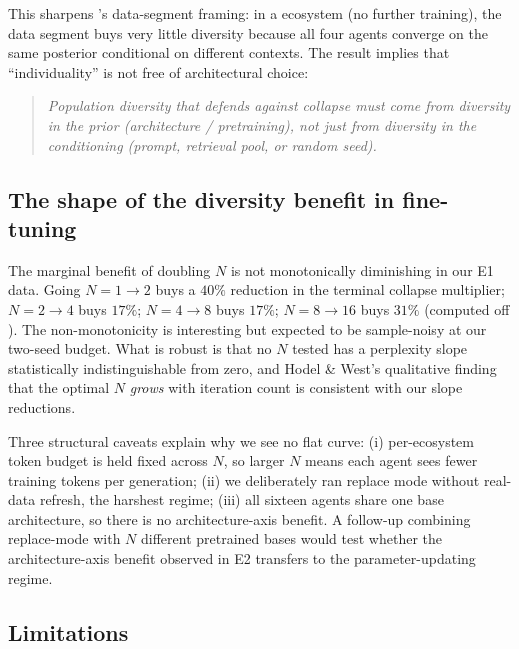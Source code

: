 This sharpens \citet{hodel2026epistemic}'s data-segment framing: in a
\rag ecosystem (no further training), the data segment buys very
little diversity because all four agents converge on the same
posterior conditional on different contexts. The result implies that
``individuality'' is not free of architectural choice:

\begin{quote}
\itshape
Population diversity that defends against collapse must come from
diversity in the \emph{prior} (architecture / pretraining), not just
from diversity in the \emph{conditioning} (prompt, retrieval pool,
or random seed).
\end{quote}

\subsection{The shape of the diversity benefit in fine-tuning}

The marginal benefit of doubling $N$ is not monotonically diminishing
in our E1 data. Going $N{=}1 \to 2$ buys a $40\%$ reduction in the
terminal collapse multiplier; $N{=}2 \to 4$ buys $17\%$;
$N{=}4 \to 8$ buys $17\%$; $N{=}8 \to 16$ buys $31\%$ (computed off
). The non-monotonicity is interesting but
expected to be sample-noisy at our two-seed budget. What is robust is
that no $N$ tested has a perplexity slope statistically
indistinguishable from zero, and Hodel \& West's qualitative finding
that the optimal $N$ \emph{grows} with iteration count
\citep{hodel2026epistemic} is consistent with our slope reductions.

Three structural caveats explain why we see no flat curve: (i)
per-ecosystem token budget is held fixed across $N$, so larger $N$
means each agent sees fewer training tokens per generation; (ii) we
deliberately ran replace mode without real-data refresh, the harshest
\citet{shumailov2024nature} regime; (iii) all sixteen agents share one
base architecture, so there is no architecture-axis benefit. A
follow-up combining replace-mode with $N$ different pretrained bases
would test whether the architecture-axis benefit observed in E2
transfers to the parameter-updating regime.

\subsection{Limitations}

